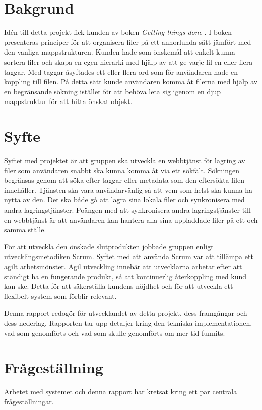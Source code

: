 \documentclass[a4paper,12pt,oneside,final]{extbook}
\begin{document}
\section{Bakgrund}
Idén till detta projekt fick kunden av boken \textit{Getting things done} \cite{gettingthingsdone}. I boken presenteras principer för att organisera filer på ett annorlunda sätt jämfört med den vanliga mappstrukturen. Kunden hade som önskemål att enkelt kunna sortera filer och skapa en egen hierarki med hjälp av att ge varje fil en eller flera taggar. Med taggar åsyftades ett eller flera ord som för användaren hade en koppling till filen. På detta sätt kunde användaren komma åt filerna med hjälp av en begränsande sökning istället för att behöva leta sig igenom en djup mappstruktur för att hitta önskat objekt.

\section{Syfte}
Syftet med projektet är att gruppen ska utveckla en webbtjänst för lagring av filer som användaren snabbt ska kunna komma åt via ett sökfält. Sökningen begränsas genom att söka efter taggar eller metadata som den eftersökta filen innehåller. Tjänsten ska vara användarvänlig så att vem som helst ska kunna ha nytta av den. Det ska både gå att lagra sina lokala filer och synkronisera med andra lagringstjänster. Poängen med att synkronisera andra lagringstjänster till en webbtjänst är att användaren kan hantera alla sina uppladdade filer på ett och samma ställe.

För att utveckla den önskade slutprodukten jobbade gruppen enligt utvecklingsmetodiken Scrum. Syftet med att använda Scrum var att tillämpa ett agilt arbetsmönster. Agil utveckling innebär att utvecklarna arbetar efter att ständigt ha en fungerande produkt, så att kontinuerlig återkoppling med kund kan ske. Detta för att säkerställa kundens nöjdhet och för att utveckla ett flexibelt system som förblir relevant. \cite{softwareeng}

Denna rapport redogör för utvecklandet av detta projekt, dess framgångar och dess nederlag. Rapporten tar upp detaljer kring den tekniska implementationen, vad som genomförts och vad som skulle genomförts om mer tid funnits.

\section{Frågeställning}
Arbetet med systemet och denna rapport har kretsat kring ett par centrala frågeställningar.
\end{document}
